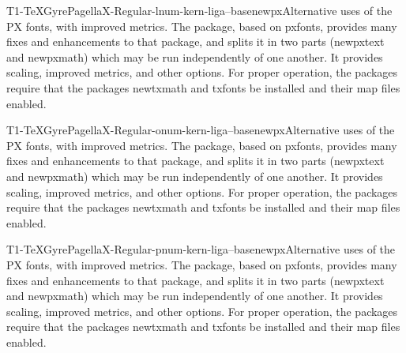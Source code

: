 \documentclass{ddltxtyp}
\begin{document}

\begin{package}{T1-TeXGyrePagellaX-Regular-lnum-kern-liga--base}{newpx}{Alternative uses of the PX fonts, with improved metrics.}
The package, based on pxfonts, provides many fixes and
enhancements to that package, and splits it in two parts
(newpxtext and newpxmath) which may be run independently of one
another. It provides scaling, improved metrics, and other
options. For proper operation, the packages require that the
packages newtxmath and txfonts be installed and their map files
enabled.
\end{package}
\begin{package}{T1-TeXGyrePagellaX-Regular-onum-kern-liga--base}{newpx}{Alternative uses of the PX fonts, with improved metrics.}
The package, based on pxfonts, provides many fixes and
enhancements to that package, and splits it in two parts
(newpxtext and newpxmath) which may be run independently of one
another. It provides scaling, improved metrics, and other
options. For proper operation, the packages require that the
packages newtxmath and txfonts be installed and their map files
enabled.
\end{package}
\begin{package}{T1-TeXGyrePagellaX-Regular-pnum-kern-liga--base}{newpx}{Alternative uses of the PX fonts, with improved metrics.}
The package, based on pxfonts, provides many fixes and
enhancements to that package, and splits it in two parts
(newpxtext and newpxmath) which may be run independently of one
another. It provides scaling, improved metrics, and other
options. For proper operation, the packages require that the
packages newtxmath and txfonts be installed and their map files
enabled.
\end{package}
\end{document}
